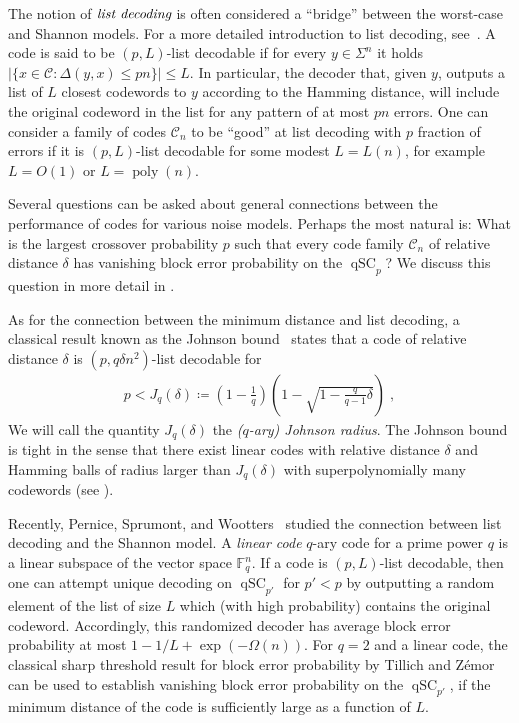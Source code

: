 \documentclass{article}
\DeclareMathOperator{\qSC}{qSC}
\DeclareMathOperator{\poly}{poly}
\newcommand{\cC}{\mathcal{C}}
\theoremstyle{plain}
\theoremstyle{plain}
\theoremstyle{plain}
\theoremstyle{plain}
\theoremstyle{plain}
\theoremstyle{plain}
\theoremstyle{plain}
\theoremstyle{plain}
\theoremstyle{plain}
\theoremstyle{plain}
\theoremstyle{remark}
\theoremstyle{remark}
\theoremstyle{remark}
\theoremstyle{plain}
\begin{document}
The notion of $\emph{list decoding}$
is often considered a ``bridge'' between
the worst-case and Shannon models. For a more detailed
introduction to list decoding, see~\cite[Chapter 7]{guruswami2012essential}. A code is said to be
$(p, L)$-list decodable if for every $y\in\Sigma^n$
it holds $|\{x\in\cC:\Delta(y,x)\le pn\}|\le L$. In particular,
the decoder that, given $y$, outputs a list of $L$ closest
codewords to $y$ according to the Hamming distance,
will include the original codeword in the list for any
pattern of at most $pn$ errors. One can consider a 
family of codes $\cC_n$ to be ``good'' at list decoding with $p$ fraction of errors if it is $(p,L)$-list decodable for some modest $L=L(n)$, for example $L=O(1)$ or $L=\poly(n)$.

Several questions can be asked 
about general connections between 
the performance of codes for various
noise models. Perhaps the most natural is: 
What is the largest crossover probability $p$
such that every code family $\cC_n$ of relative distance
$\delta$ has vanishing block error probability on the $\qSC_p$?
We discuss this question
in more detail in
.

As for the connection between the
minimum distance and
list decoding, a
classical result known as
the Johnson bound~\cite{Joh62} states that a code
of relative distance $\delta$ 
is $(p,q\delta n^2)$-list decodable for
\begin{align*}
p<J_q(\delta)\coloneqq \left(1-\frac{1}{q}\right)
\left(1-\sqrt{1-\frac{q}{q-1}\delta}\right)\;,
\end{align*}
We will call the quantity $J_q(\delta)$ the \emph{($q$-ary) Johnson radius}.
The Johnson bound is tight in the sense that there exist linear codes
with relative distance $\delta$ and Hamming balls of radius
larger than $J_q(\delta)$ with superpolynomially many codewords
(see \cite[Exercise 7.9]{guruswami2012essential}).

Recently, Pernice, Sprumont, and Wootters~\cite{pernice2025list} studied the
connection between list decoding and
the Shannon model. A \emph{linear code} 
$q$-ary code
for a prime power $q$ is a linear subspace of the
vector space $\mathbb{F}_q^n$.
If a code
is $(p,L)$-list decodable,
then one can attempt unique decoding on $\qSC_{p'}$ for $p'<p$ 
by outputting a random element of the list of
size $L$ which
(with high probability)
contains the original codeword. Accordingly,
this randomized decoder 
has average block error probability
at most $1-1/L+\exp(-\Omega(n))$.
For $q=2$ and a linear code,
the classical sharp threshold
result for block error probability by Tillich and Zémor
\cite{tillich2000discrete} can be used 
to establish vanishing block error probability
on the $\qSC_{p'}$,
if the minimum distance of
the code is sufficiently large as a function of $L$.
\end{document}

